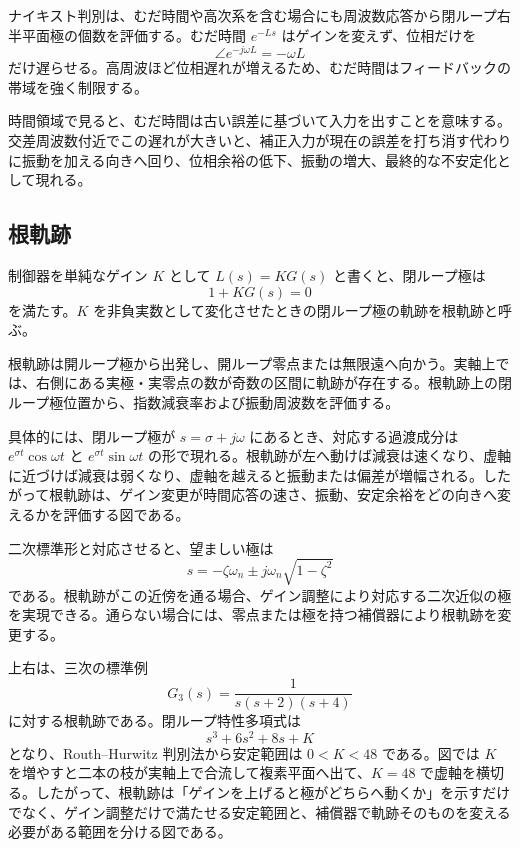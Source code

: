 ナイキスト判別は、むだ時間や高次系を含む場合にも周波数応答から閉ループ右半平面極の個数を評価する。むだ時間 $e^{-Ls}$ はゲインを変えず、位相だけを
\begin{equation}
  \angle e^{-j\omega L}=-\omega L
\end{equation}
だけ遅らせる。高周波ほど位相遅れが増えるため、むだ時間はフィードバックの帯域を強く制限する。

時間領域で見ると、むだ時間は古い誤差に基づいて入力を出すことを意味する。交差周波数付近でこの遅れが大きいと、補正入力が現在の誤差を打ち消す代わりに振動を加える向きへ回り、位相余裕の低下、振動の増大、最終的な不安定化として現れる。

\subsection{根軌跡}

制御器を単純なゲイン $K$ として $L(s)=KG(s)$ と書くと、閉ループ極は
\begin{equation}
  1+KG(s)=0
\end{equation}
を満たす。$K$ を非負実数として変化させたときの閉ループ極の軌跡を根軌跡と呼ぶ。

根軌跡は開ループ極から出発し、開ループ零点または無限遠へ向かう。実軸上では、右側にある実極・実零点の数が奇数の区間に軌跡が存在する。根軌跡上の閉ループ極位置から、指数減衰率および振動周波数を評価する。

具体的には、閉ループ極が $s=\sigma+j\omega$ にあるとき、対応する過渡成分は $e^{\sigma t}\cos\omega t$ と $e^{\sigma t}\sin\omega t$ の形で現れる。根軌跡が左へ動けば減衰は速くなり、虚軸に近づけば減衰は弱くなり、虚軸を越えると振動または偏差が増幅される。したがって根軌跡は、ゲイン変更が時間応答の速さ、振動、安定余裕をどの向きへ変えるかを評価する図である。

二次標準形と対応させると、望ましい極は
\begin{equation}
  s=-\zeta\omega_n\pm j\omega_n\sqrt{1-\zeta^2}
\end{equation}
である。根軌跡がこの近傍を通る場合、ゲイン調整により対応する二次近似の極を実現できる。通らない場合には、零点または極を持つ補償器により根軌跡を変更する。

 上右は、三次の標準例
\begin{equation}
  G_3(s)=\frac{1}{s(s+2)(s+4)}
\end{equation}
に対する根軌跡である。閉ループ特性多項式は
\begin{equation}
  s^3+6s^2+8s+K
\end{equation}
となり、Routh--Hurwitz 判別法から安定範囲は $0<K<48$ である。図では $K$ を増やすと二本の枝が実軸上で合流して複素平面へ出て、$K=48$ で虚軸を横切る。したがって、根軌跡は「ゲインを上げると極がどちらへ動くか」を示すだけでなく、ゲイン調整だけで満たせる安定範囲と、補償器で軌跡そのものを変える必要がある範囲を分ける図である。

